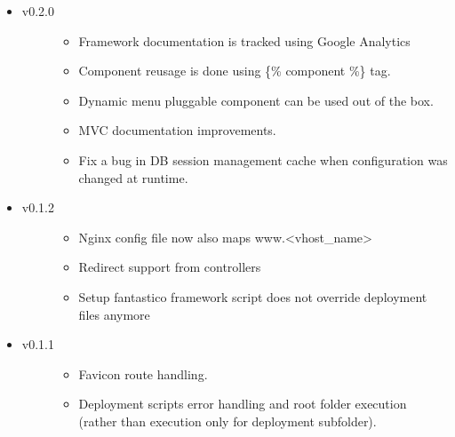 \documentclass[letterpaper,10pt,english]{sphinxmanual}
\begin{document}
\begin{itemize}
\begin{description}
\end{description}

\item {} \begin{description}
\item[{v0.2.0}] \leavevmode\begin{itemize}
\item {} 
Framework documentation is tracked using Google Analytics

\item {} 
Component reusage is done using \{\% component \%\} tag.

\item {} 
Dynamic menu pluggable component can be used out of the box.

\item {} 
MVC documentation improvements.

\item {} 
Fix a bug in DB session management cache when configuration was changed at runtime.

\end{itemize}

\end{description}

\item {} \begin{description}
\item[{v0.1.2}] \leavevmode\begin{itemize}
\item {} 
Nginx config file now also maps www.\textless{}vhost\_name\textgreater{}

\item {} 
Redirect support from controllers

\item {} 
Setup fantastico framework script does not override deployment files anymore

\end{itemize}

\end{description}

\item {} \begin{description}
\item[{v0.1.1}] \leavevmode\begin{itemize}
\item {} 
Favicon route handling.

\item {} 
Deployment scripts error handling and root folder execution (rather than execution only for deployment subfolder).


\end{itemize}
\end{description}
\end{itemize}
\end{document}
